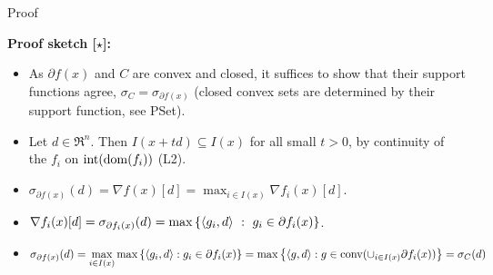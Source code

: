 \documentclass[9pt]{beamer}
\begin{document}
\begin{frame}{Proof}

  \textbf{Proof sketch [$\star$]:}
  \begin{itemize}
  \item As $\partial f(x)$ and $C$ are convex and closed, it suffices to show that their support functions agree, $\sigma_C = \sigma_{\partial f(x)}$ (closed convex sets are determined by their support function, see PSet).
  \item Let $d \in \Re^n$. Then $I(x + td) \subseteq I(x)$ for all small $t>0$, by continuity of the $f_i$ on $\operatorname{int}(\operatorname{dom}(f_i))$ (L2).
  \item $\sigma_{\partial f(x)}(d) = \nabla f(x)[d] = \max_{i \in I(x)} \nabla f_i(x)[d]$.
  \item $\nabla f_i(x)[d] = \sigma_{\partial f_i(x)}(d) = \max \left\{ \left<g_i, d\right>\ : \ g_i \in \partial f_i(x) \right\}$.
  \item $\sigma_{\partial f(x)}(d) = {\displaystyle\max_{i\in I(x)}} \max\set{\iprod{g_i}{d}\!\!}{\!\!g_i\in \partial f_i(x)} = \max\set{\iprod{g}{d}\!\!}{\!\!g\in \conv({\displaystyle \cup_{i\in I(x)}}\partial f_i(x))} = \sigma_C(d)$
  \end{itemize}

\end{frame}


  
\end{document}
